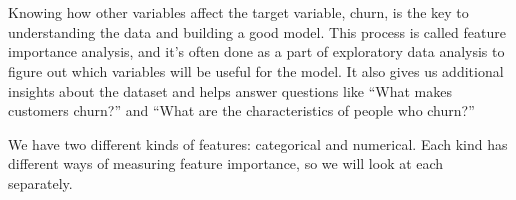 \chapter{\label{Ch13}}
\subsection{}
Knowing how other variables affect the target variable, churn, is the key to understanding the data and building a good model. This process is called feature importance analysis, and it’s often done as a part of exploratory data analysis to figure out which variables will be useful for the model. It also gives us additional insights about the dataset and helps answer questions like “What makes customers churn?” and “What are the characteristics of people who churn?”

We have two different kinds of features: categorical and numerical. Each kind has different ways of measuring feature importance, so we will look at each separately.